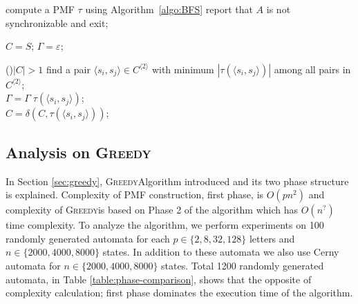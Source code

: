 \documentclass[12pt]{article}
\newcommand{\greedyAlgo}{\textsc{Greedy}}
\begin{document}
\renewcommand{\baselinestretch}{0.9}
\begin{algorithm}
	\label{algo:greedy}
	\caption{Eppstein's \textsc{Greedy} Algorithm}
	
	
	compute a PMF $\tau$ using Algorithm~\ref{algo:BFS}\;
	{
		report that $A$ is not synchronizable and exit;	
	}

	
	$C = S$; 
	$\Gamma = \varepsilon$; 
	
	\While(){$|C| > 1$}
	{
		find a pair $\langle s_i,s_j \rangle \in C^{\langle 2 \rangle}$ 
		with minimum $|\tau(\langle s_i,s_j \rangle)|$ among all pairs 
		in $C^{\langle 2 \rangle}$;\\
		
		
		$\Gamma = \Gamma \; \tau(\langle s_i,s_j \rangle)$;\\
		$C = \delta(C,\tau(\langle s_i,s_j \rangle))$;
	}
\end{algorithm}
\renewcommand{\baselinestretch}{1}


\subsection{Analysis on \greedyAlgo}
\label{subsec:greedy-analysis}


In Section \ref{sec:greedy}, \greedyAlgo \space Algorithm introduced and its two phase structure is explained. Complexity of PMF construction, first phase, is $O(pn^2)$ and complexity of \greedyAlgo \space is based on Phase 2 of the algorithm which has $O(n^?)$ time complexity. To analyze the algorithm, we perform experiments on 100 randomly generated automata for each  $p \in \{2, 8, 32, 128\}$ letters and  $n \in \{2000, 4000, 8000\}$ states. In addition to these automata we also use Cerny automata \cite{cerny} for $n \in \{2000, 4000, 8000\}$ states. Total 1200 randomly generated automata, in Table \ref{table:phase-comparison}, shows that the opposite of complexity calculation; first phase dominates the execution time of the algorithm.
\end{document}
